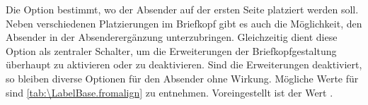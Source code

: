 \begin{Declaration}
\end{Declaration}
%
Die Option  bestimmt, wo der
Absender auf der ersten Seite platziert werden soll. Neben
verschiedenen Platzierungen im Briefkopf gibt es
auch die Möglichkeit, den Absender in der
Absenderergänzung
unterzubringen. Gleichzeitig dient diese Option als
zentraler Schalter, um die Erweiterungen der Briefkopfgestaltung überhaupt zu
aktivieren oder zu deaktivieren. Sind die Erweiterungen deaktiviert, so
bleiben %
\iffalse %
die Optionen \DescRef{\LabelBase.option.fromrule},
\DescRef{\LabelBase.option.fromphone},
\DescRef{\LabelBase.option.frommobilephone},
\DescRef{\LabelBase.option.fromemail}, \DescRef{\LabelBase.option.fromurl} und
\DescRef{\LabelBase.option.fromlogo} %
\else%
diverse Optionen für den Absender %
\fi %
ohne Wirkung. Mögliche Werte für  sind
\autoref{tab:\LabelBase.fromalign} zu entnehmen. Voreingestellt ist der Wert
.%
\EndIndexGroup
%
